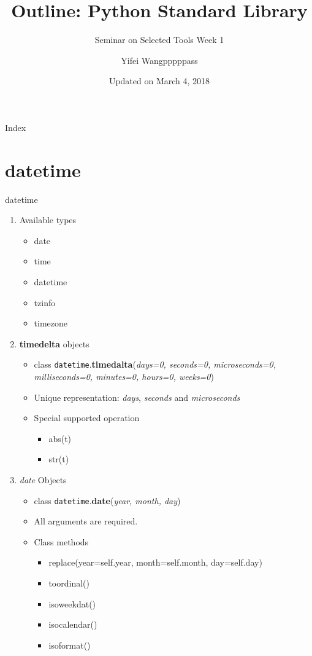 \documentclass[xcolor=table]{mysld}
\title{Outline: Python Standard Library}
\subtitle{Seminar on Selected Tools Week 1}
\author{Yifei Wang\quad pppppass}
\date{Updated on March 4, 2018}
\begin{document}
\begin{frame}
\titlepage
\end{frame}

\begin{frame}{Index}
\tableofcontents
\end{frame}

\section{datetime}
\begin{frame}[allowframebreaks]{datetime}
\begin{enumerate}
\item Available types
\begin{itemize}
\item date
\item time
\item datetime
\item tzinfo
\item timezone
\end{itemize}
\item \textbf{timedelta} objects
\begin{itemize}
\item class \texttt{datetime}.\textbf{timedalta}(\textit{days=0, seconds=0, microseconds=0, milliseconds=0, minutes=0, hours=0, weeks=0}) 
\item Unique representation: \textit{days}, \textit{seconds} and \textit{microseconds}
\item Special supported operation
\begin{itemize}
\item abs(t)
\item str(t)
\end{itemize}
\end{itemize}
\framebreak
\item \textit{date} Objects
\begin{itemize}
\item class \texttt{datetime}.\textbf{date}(\textit{year, month, day})
\item All arguments are required. 
\item Class methods
\begin{itemize}
\item replace(year=self.year, month=self.month, day=self.day)
\item toordinal()
\item isoweekdat()
\item isocalendar()
\item isoformat()

\end{itemize}
\end{itemize}
\end{enumerate}
\end{frame}
\end{document}
